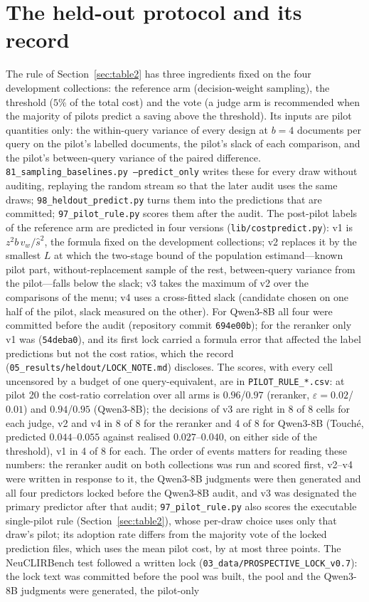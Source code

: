 \documentclass{article}
\newcommand{\eps}{\varepsilon}
\begin{document}
\section{The held-out protocol and its record}\label{app:heldout}
The rule of Section~\ref{sec:table2} has three ingredients fixed on the four development collections: the reference arm (decision-weight sampling), the threshold ($5\%$ of the total cost) and the vote (a judge arm is recommended when the majority of pilots predict a saving above the threshold). Its inputs are pilot quantities only: the within-query variance of every design at $b=4$ documents per query on the pilot's labelled documents, the pilot's slack of each comparison, and the pilot's between-query variance of the paired difference. \texttt{81\_sampling\_baselines.py --predict\_only} writes these for every draw without auditing, replaying the random stream so that the later audit uses the same draws; \texttt{98\_heldout\_predict.py} turns them into the predictions that are committed; \texttt{97\_pilot\_rule.py} scores them after the audit. The post-pilot labels of the reference arm are predicted in four versions (\texttt{lib/costpredict.py}): v1 is $z^2 b\,v_w/\hat s^2$, the formula fixed on the development collections; v2 replaces it by the smallest $L$ at which the two-stage bound of the population estimand---known pilot part, without-replacement sample of the rest, between-query variance from the pilot---falls below the slack; v3 takes the maximum of v2 over the comparisons of the menu; v4 uses a cross-fitted slack (candidate chosen on one half of the pilot, slack measured on the other). For Qwen3-8B all four were committed before the audit (repository commit \texttt{694e00b}); for the reranker only v1 was (\texttt{54deba0}), and its first lock carried a formula error that affected the label predictions but not the cost ratios, which the record (\texttt{05\_results/heldout/LOCK\_NOTE.md}) discloses. The scores, with every cell uncensored by a budget of one query-equivalent, are in \texttt{PILOT\_RULE\_*.csv}: at pilot 20 the cost-ratio correlation over all arms is $0.96$/$0.97$ (reranker, $\eps=0.02$/$0.01$) and $0.94$/$0.95$ (Qwen3-8B); the decisions of v3 are right in 8 of 8 cells for each judge, v2 and v4 in 8 of 8 for the reranker and 4 of 8 for Qwen3-8B (Touch\'e, predicted $0.044$--$0.055$ against realised $0.027$--$0.040$, on either side of the threshold), v1 in 4 of 8 for each. The order of events matters for reading these numbers: the reranker audit on both collections was run and scored first, v2--v4 were written in response to it, the Qwen3-8B judgments were then generated and all four predictors locked before the Qwen3-8B audit, and v3 was designated the primary predictor after that audit; \texttt{97\_pilot\_rule.py} also scores the executable single-pilot rule (Section~\ref{sec:table2}), whose per-draw choice uses only that draw's pilot; its adoption rate differs from the majority vote of the locked prediction files, which uses the mean pilot cost, by at most three points. The NeuCLIRBench test followed a written lock (\texttt{03\_data/PROSPECTIVE\_LOCK\_v0.7}): the lock text was committed before the pool was built, the pool and the Qwen3-8B judgments were generated, the pilot-only 
\end{document}
